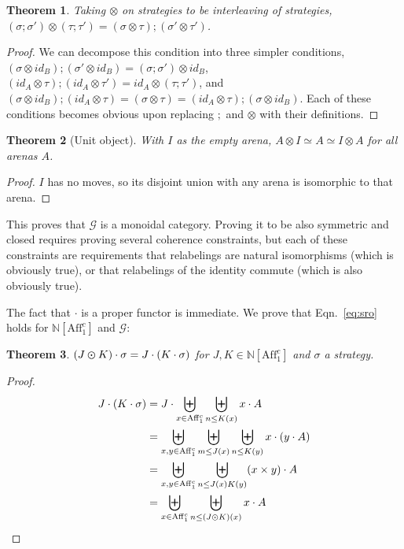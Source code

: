 \documentclass{article}
\newtheorem{theorem}{Theorem}
\newcommand{\cattimes}{\varodot}
\begin{document}
\begin{theorem}
  Taking ${\otimes}$ on strategies to be interleaving of strategies, $(\sigma;\sigma')\otimes(\tau;\tau') = (\sigma\otimes\tau);(\sigma'\otimes\tau')$.
\end{theorem}
\begin{proof}
  We can decompose this condition into three simpler conditions, $(\sigma\otimes id_B);(\sigma'\otimes id_B)=(\sigma;\sigma')\otimes id_B$, $(id_A\otimes\tau);(id_A\otimes\tau')= id_A\otimes(\tau;\tau')$, and $(\sigma\otimes id_B);(id_A\otimes\tau)=(\sigma\otimes\tau) = (id_A\otimes\tau);(\sigma\otimes id_B)$. Each of these conditions becomes obvious upon replacing $;$ and $\otimes$ with their definitions.
\end{proof}
\begin{theorem}[Unit object]
  With $I$ as the empty arena, $A\otimes I\simeq A\simeq I\otimes A$ for all arenas $A$.
\end{theorem}
\begin{proof}
  $I$ has no moves, so its disjoint union with any arena is isomorphic to that arena.
\end{proof}
This proves that $\mathcal G$ is a monoidal category. Proving it to be also symmetric and closed requires proving several coherence constraints, but each of these constraints are requirements that relabelings are natural isomorphisms (which is obviously true), or that relabelings of the identity commute (which is also obviously true).

\allowdisplaybreaks 
The fact that $\cdot$ is a proper functor is immediate. We  prove that Eqn.~\ref{eq:sro} holds for $\mathbb
N[\mathrm{Aff}_1^c]$ and $\mathcal G$:
\begin{theorem}
  $(J\cattimes K)\cdot\sigma = J\cdot(K\cdot\sigma)$ for $J,K \in \mathbb
N[\mathrm{Aff}_1^c]$ and $\sigma$ a strategy.
\end{theorem}
\begin{proof}
  \begin{align*}
    J\cdot(K\cdot\sigma) &= J\cdot\biguplus_{x\in
\mathrm{Aff}_1^c}\biguplus_{n\leq K(x)} x\cdot A\\
    &= \biguplus_{x,y\in\mathrm{Aff}_1^c}\biguplus_{m\leq
J(x)}\biguplus_{n\leq K(y)} x\cdot (y\cdot A)\\
    &= \biguplus_{x,y\in\mathrm{Aff}_1^c}\biguplus_{n\leq J(x)K(y)} (x
\times y)\cdot A\\
    &= \biguplus_{x\in\mathrm{Aff}_1^c}\biguplus_{n\leq (J\cattimes K)(x)}
x\cdot A
  \end{align*}
\end{proof}
\end{document}

